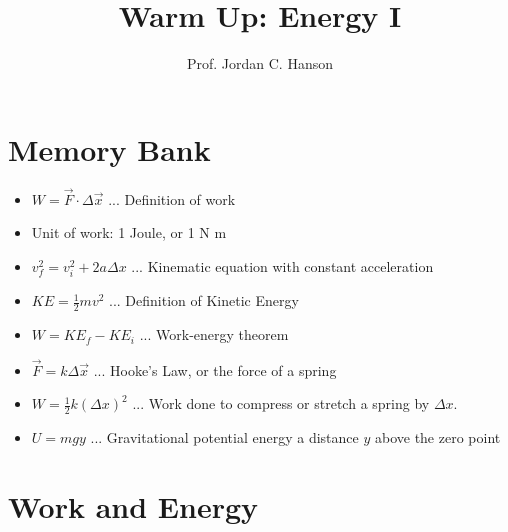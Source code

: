 \documentclass{article}
\begin{document}
\twocolumn

\title{Warm Up: Energy I}
\author{Prof. Jordan C. Hanson}

\maketitle

\section{Memory Bank}

\begin{itemize}
\item $W = \vec{F} \cdot \Delta \vec{x}$ ... Definition of work
\item Unit of work: 1 Joule, or 1 N m
\item $v_f^2 = v_i^2 + 2 a \Delta x$ ... Kinematic equation with constant acceleration
\item $KE = \frac{1}{2}m v^2$ ... Definition of Kinetic Energy
\item $W = KE_f - KE_i$ ... Work-energy theorem
\item $\vec{F} = k\Delta \vec{x}$ ... Hooke's Law, or the force of a spring
\item $W = \frac{1}{2}k(\Delta x)^2$ ... Work done to compress or stretch a spring by $\Delta x$.
\item $U = mgy$ ... Gravitational potential energy a distance $y$ above the zero point
\end{itemize}

\section{Work and Energy}
\end{document}
